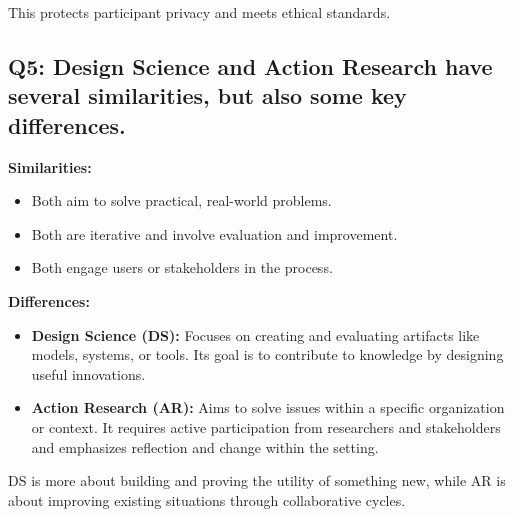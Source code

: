 This protects participant privacy and meets ethical standards.

\subsection*{Q5: Design Science and Action Research have several similarities, but also some key differences.}

\textbf{Similarities:}
\begin{itemize}
  \item Both aim to solve practical, real-world problems.
  \item Both are iterative and involve evaluation and improvement.
  \item Both engage users or stakeholders in the process.
\end{itemize}

\textbf{Differences:}
\begin{itemize}
  \item \textbf{Design Science (DS):} Focuses on creating and evaluating artifacts like models, systems, or tools. Its goal is to contribute to knowledge by designing useful innovations.
  \item \textbf{Action Research (AR):} Aims to solve issues within a specific organization or context. It requires active participation from researchers and stakeholders and emphasizes reflection and change within the setting.
\end{itemize}

DS is more about building and proving the utility of something new, while AR is about improving existing situations through collaborative cycles.


